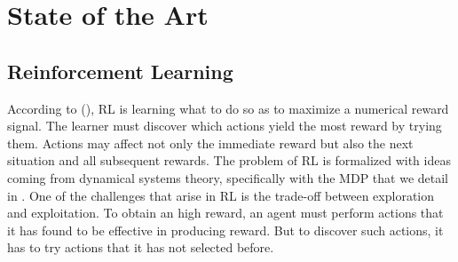 \chapter{State of the Art} \label{chap:stateoftheart}

\section{Reinforcement Learning}
According to (\cite{sutton2018reinforcement}), \acf{RL} is learning what to do so as to maximize a numerical reward signal. The learner must discover which actions yield the most reward by trying them. Actions may affect not only the immediate reward but also the next situation and all subsequent rewards. The problem of \ac{RL} is formalized with ideas coming from dynamical systems theory, specifically with the \acf{MDP} that we detail in . One of the challenges that arise in \ac{RL} is the trade-off between exploration and exploitation. To obtain an high reward, an agent must perform actions that it has found to be effective in producing reward. But to discover such actions, it has to try actions that it has not selected before.

